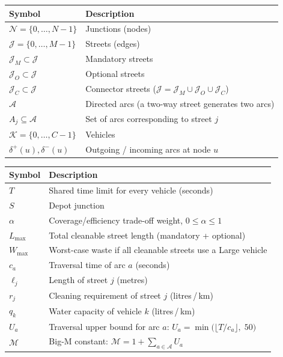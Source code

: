 \documentclass[11pt]{article}
\newcommand{\setN}{\mathcal{N}}
\newcommand{\setJ}{\mathcal{J}}
\newcommand{\Jm}{\mathcal{J}_M}
\newcommand{\Jo}{\mathcal{J}_O}
\newcommand{\Jc}{\mathcal{J}_C}
\newcommand{\setA}{\mathcal{A}}
\newcommand{\Aj}{A_j}
\newcommand{\setK}{\mathcal{K}}
\newcommand{\depot}{S}
\begin{document}
\begin{center}
\begin{tabular}{@{} l l @{}}
\toprule
Symbol & Description \\
\midrule
$\setN = \{0, \dots, N-1\}$       & Junctions (nodes) \\
$\setJ = \{0, \dots, M-1\}$       & Streets (edges) \\
$\Jm \subset \setJ$               & Mandatory streets \\
$\Jo \subset \setJ$               & Optional streets \\
$\Jc \subset \setJ$               & Connector streets ($\setJ = \Jm \cup \Jo \cup \Jc$) \\
$\setA$                            & Directed arcs (a two-way street generates two arcs) \\
$\Aj \subseteq \setA$             & Set of arcs corresponding to street $j$ \\
$\setK = \{0, \dots, C-1\}$       & Vehicles \\
$\delta^+(u), \delta^-(u)$         & Outgoing / incoming arcs at node $u$ \\
\bottomrule
\end{tabular}
\end{center}


\begin{center}
\begin{tabular}{@{} l l @{}}
\toprule
Symbol & Description \\
\midrule
$T$            & Shared time limit for every vehicle (seconds) \\
$\depot$       & Depot junction \\
$\alpha$       & Coverage/efficiency trade-off weight, $0 \le \alpha \le 1$ \\
$L_{\max}$     & Total cleanable street length (mandatory + optional) \\
$W_{\max}$     & Worst-case waste if all cleanable streets use a Large vehicle \\
$c_a$          & Traversal time of arc $a$ (seconds) \\
$\ell_j$       & Length of street $j$ (metres) \\
$r_j$          & Cleaning requirement of street $j$ (litres\,/\,km) \\
$q_k$          & Water capacity of vehicle $k$ (litres\,/\,km) \\
$U_a$          & Traversal upper bound for arc $a$: $U_a = \min\!\bigl(\lfloor T / c_a \rfloor,\; 50\bigr)$ \\
$\mathcal{M}$  & Big-M constant: $\mathcal{M} = 1 + \sum_{a \in \setA} U_a$ \\
\bottomrule
\end{tabular}
\end{center}
\end{document}

